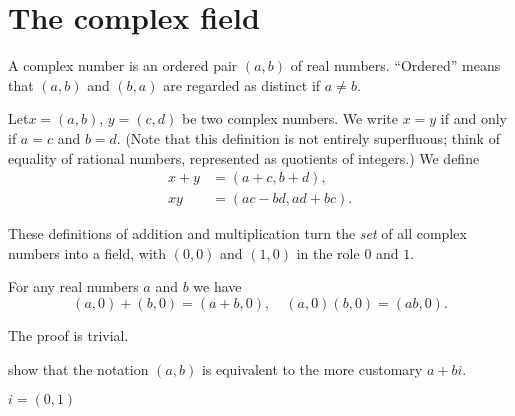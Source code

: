 
\section{The complex field}


\begin{mydef}
    \label{mydef:1.24}
    A complex number is an ordered pair $(a, b)$ of real numbers.
    ``Ordered'' means that $(a, b)$ and $(b, a)$ are regarded as distinct if $a \neq b$.

    Let$x = (a, b)$, $y = (c,d)$ be two complex numbers. 
    We write $x =y$ if and only if $a =c$ and $b=d$. 
    (Note that this definition is not entirely superfluous;
    think of equality of rational numbers, 
    represented as quotients of integers.) 
    We define
    \begin{align*}
        x+y &= (a + c, b + d),\\
        xy  &= (ac - bd, ad + bc).
    \end{align*}
\end{mydef}

\begin{thm}
    \label{thm:1.25}
    These definitions of addition and multiplication 
    turn the \emph{set} of all complex numbers into a field, 
    with $(0, 0)$ and $(1, 0)$ in the role $0$ and $1$.
\end{thm}


\begin{thm}
    \label{thm:1.26}
    For any real numbers $a$ and $b$ we have
    \begin{equation*}
        (a,0)+ (b,0) = (a+ b,0),\quad
        (a,0)(b,0) = (ab,0).
    \end{equation*}
\end{thm}
The proof is trivial.

show that the notation $(a, b)$ is equivalent to the more customary $a + bi$.

\begin{mydef}
    \label{mydef:1.27}
    $i=(0,1)$    
\end{mydef}

